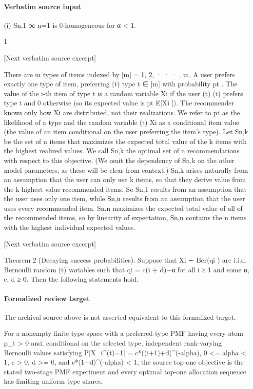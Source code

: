 \documentclass[10pt]{article}
\begin{document}
\paragraph{Verbatim source input}
\begin{ReviewVerbatim}
(i) {Sn,1 }∞
n=1 is 0-homogeneous for α < 1.

1

[Next verbatim source excerpt]

There are m types of items indexed by [m] = {1, 2, · · · , m}. A user prefers exactly one type of item, preferring
(t)
type t ∈ [m] with probability pt . The value of the i-th item of type t is a random variable Xi if the user
(t)
(t)
prefers type t and 0 otherwise (so its expected value is pt E[Xi ]). The recommender knows only how Xi
are distributed, not their realizations. We refer to pt as the likelihood of a type and the random variable
(t)
Xi as a conditional item value (the value of an item conditional on the user preferring the item’s type).
Let Sn,k be the set of n items that maximizes the expected total value of the k items with the highest
realized values. We call Sn,k the optimal set of n recommendations with respect to this objective. (We omit
the dependency of Sn,k on the other model parameters, as these will be clear from context.)
Sn,k arises naturally from an assumption that the user can only use k items, so that they derive value
from the k highest value recommended items. So Sn,1 results from an assumption that the user uses only
one item, while Sn,n results from an assumption that the user uses every recommended item.
Sn,n maximizes the expected total value of all of the recommended items, so by linearity of expectation,
Sn,n contains the n items with the highest individual expected values.

[Next verbatim source excerpt]

Theorem 2 (Decaying success probabilities). Suppose that Xi ∼ Ber(qi ) are i.i.d. Bernoulli random
(t)
variables such that qi = c(i + d)−α for all i ≥ 1 and some α, c, d ≥ 0. Then the following statements hold.
\end{ReviewVerbatim}


\paragraph{Formalized review target}
The archival source above is not asserted equivalent to this formalized target.
\begin{ReviewVerbatim}
For a nonempty finite type space with a preferred-type PMF having every atom p_t > 0 and, conditional on the selected type, independent rank-varying Bernoulli values satisfying P[X_i^(t)=1] = c*((i+1)+d)^(-alpha), 0 <= alpha < 1, c > 0, d >= 0, and c*(1+d)^(-alpha) < 1, the source top-one objective is the stated two-stage PMF experiment and every optimal top-one allocation sequence has limiting uniform type shares.
\end{ReviewVerbatim}
\end{document}

